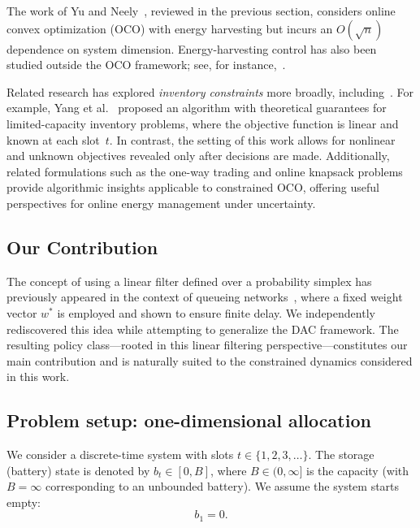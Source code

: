 The work of Yu and Neely~\cite{Yu2019}, reviewed in the previous section, considers online convex optimization (OCO) with energy harvesting but incurs an $O(\sqrt{n})$ dependence on system dimension.  
Energy-harvesting control has also been studied outside the OCO framework; see, for instance,~\cite{yang2011optimal,tutuncuoglu2012optimum,blasco2013learning,michelusi2013transmission,shaviv2016universally,wu2016online,arafa2017energy,Huang2013,leonidas-energy-harvest}.  

Related research has explored \emph{inventory constraints} more broadly, including~\cite{yang2020online,lin2019competitive,chau2016cost,neely-inventory-control-cdc2010}.  
For example, Yang et al.~\cite{yang2020online} proposed an algorithm with theoretical guarantees for limited-capacity inventory problems, where the objective function is linear and known at each slot~$t$.  
In contrast, the setting of this work allows for nonlinear and unknown objectives revealed only after decisions are made.  
Additionally, related formulations such as the one-way trading and online knapsack problems~\cite{cao2020optimal,el2001optimal} provide algorithmic insights applicable to constrained OCO, offering useful perspectives for online energy management under uncertainty.

\subsection{Our Contribution}
The concept of using a linear filter defined over a probability simplex has previously appeared in the context of queueing networks~\cite{1354603}, where a fixed weight vector \(w^*\) is employed and shown to ensure finite delay. We independently rediscovered this idea while attempting to generalize the DAC framework. The resulting policy class—rooted in this linear filtering perspective—constitutes our main contribution and is naturally suited to the constrained dynamics considered in this work.




\subsection{Problem setup: one-dimensional allocation}


We consider a discrete-time system with slots \(t \in \{1,2,3,\dots\}\).  
The storage (battery) state is denoted by \(b_t \in [0,B]\), where \(B \in (0,\infty]\) is the capacity (with \(B=\infty\) corresponding to an unbounded battery).  
We assume the system starts empty:
\[
b_1 = 0.
\]

